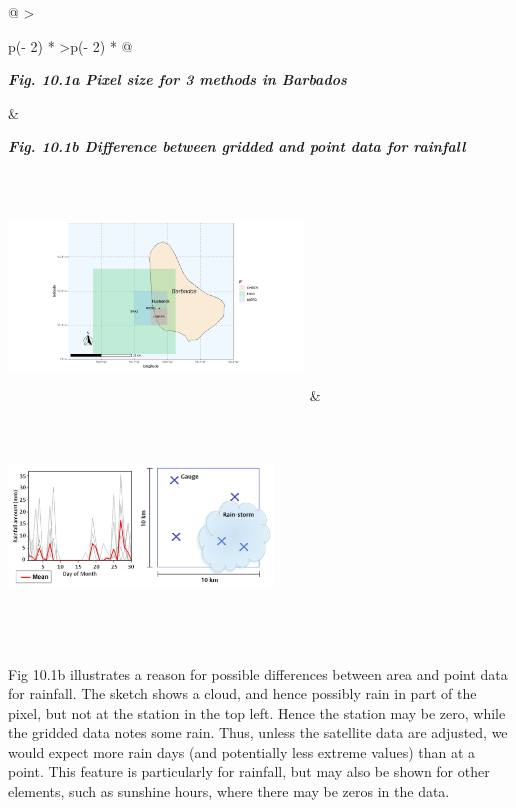 \documentclass[
  letterpaper,
  DIV=11,
  numbers=noendperiod]{scrreprt}
\begin{document}
\begin{longtable}[]{@{}
  >{\raggedright\arraybackslash}p{(\columnwidth - 2\tabcolsep) * }
  >{\raggedleft\arraybackslash}p{(\columnwidth - 2\tabcolsep) * }@{}}
\toprule\noalign{}
\begin{minipage}[b]{\linewidth}\raggedright
\textbf{\emph{Fig. 10.1a Pixel size for 3 methods in Barbados}}
\end{minipage} & \begin{minipage}[b]{\linewidth}\raggedleft
\textbf{\emph{Fig. 10.1b Difference between gridded and point data for
rainfall}}
\end{minipage} \\
\midrule\noalign{}
\endhead
\bottomrule\noalign{}
\endlastfoot
\includegraphics[width=3.09467in,height=2.18883in]{figures/Fig10.1a.png}
&
\includegraphics[width=2.77122in,height=2.50679in]{figures/Fig10.1b.png} \\
\end{longtable}

Fig 10.1b illustrates a reason for possible differences between area and
point data for rainfall. The sketch shows a cloud, and hence possibly
rain in part of the pixel, but not at the station in the top left. Hence
the station may be zero, while the gridded data notes some rain. Thus,
unless the satellite data are adjusted, we would expect more rain days
(and potentially less extreme values) than at a point. This feature is
particularly for rainfall, but may also be shown for other elements,
such as sunshine hours, where there may be zeros in the data.
\end{document}
